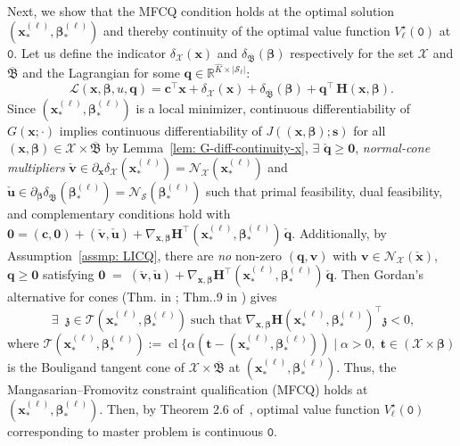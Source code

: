 \documentclass[opre,sglanonrev]{informs4}
\newcommand{\mL}{\mathcal{L}}          %
\newcommand{\mT}{\mathcal{T}}
\newcommand{\mS}{\mathcal{S}}
\newcommand{\mN}{\mathcal{N}}
\newcommand{\mX}{\mathcal{X}}
\newcommand{\mfB}{\mathfrak{B}}
\newcommand{\mbR}{\mathbb R}
\newcommand{\bbeta}{\bm{\beta}}
\newcommand{\bzero}{\bm{0}}
\newcommand{\bc}{\bm{c}}
\newcommand{\bq}{\bm{q}}
\newcommand{\bs}{\bm{s}}
\newcommand{\bt}{\bm{t}}
\newcommand{\bu}{\bm{u}}
\newcommand{\bv}{\bm{v}}
\newcommand{\bx}{\bm{x}}
\newcommand{\bH}{\bm{H}}
\begin{document}
{\begin{APPENDICES}
Next, we show that the MFCQ condition holds at the optimal solution \((\bx^{(\ell)}_*, \bbeta^{(\ell)}_*)\) and thereby continuity of the optimal value function $V^\star_\ell(\mathtt{0})$ at $\mathtt{0}$. Let us define the indicator 
$\delta_{\mX}(\bx)$ and $\delta_{\overline{\mfB}}(\bbeta)$ respectively for the set \(\mX\) and $\overline{\mfB}$ 
and the Lagrangian for some $\bq \in \mbR^{\hat{K} \times |\mS_\ell|}$:
\[
\mL(\bx, \bbeta, u, \bq)=
\bc^\top \bx +\delta_{\mX}(\bx) + \delta_{\overline{\mfB}}(\bbeta) + \bq^\top \, \bH(\bx, \bbeta).
\]
Since \((\bx^{(\ell)}_*, \bbeta^{(\ell)}_*)\) is a local minimizer, continuous differentiability of $G(\bx; \cdot )$ implies continuous differentiability of $J\left((\bx, \bbeta); \bs\right)$ for all $(\bx, \bbeta) \in \mX \times \overline{\mfB}$ by Lemma~\ref{lem: G-diff-continuity-x},
$\exists$ \(\check{\bq} \geq \bzero\), \emph{normal-cone multipliers} \(\check{\bv}\in \partial_{\bx} \delta_{\mX}(\bx^{(\ell)}_*) = \mN_{\mX}(\bx^{(\ell)}_*)\) and \(\check{\bu}\in \partial_{\bbeta} \delta_{\overline{\mfB}}(\bbeta^{(\ell)}_*) = \mN_{\mS}(\bbeta^{(\ell)}_*)\) 
such that primal feasibility, dual feasibility, and complementary conditions hold with $ \bzero=(\bc, \bzero) + (\check{\bv}, \check{\bu})
+\nabla_{\bx, \bbeta}\bH^\top(\bx^{(\ell)}_*, \bbeta^{(\ell)}_*) \, \check{\bq}.$ Additionally, by Assumption~\ref{assmp: LICQ}, there are \emph{no} non-zero \((\bq, \bv)\) with  
\(\bv\in\mN_{\mX}(\check{\bx})\), \(\bq \geq \bzero\) satisfying $ \bzero\;=\;(\check{\bv}, \check{\bu}) 
+\nabla_{\bx, \bbeta}\bH^\top(\bx^{(\ell)}_*, \bbeta^{(\ell)}_*) \, \check{\bq}.$ Then Gordan’s alternative for cones (Thm. in \cite{rockafellar2009variational};  
 Thm..9 in \cite{bazaraa2006nonlinear}) gives
\[
\;
\exists\; \; \mathfrak{z} \in\mT(\bx^{(\ell)}_*, \bbeta^{(\ell)}_*)\;\text{such that}\;
\nabla_{\bx, \bbeta}\bH(\bx^{(\ell)}_*, \bbeta^{(\ell)}_*)^{\!\top}\mathfrak{z}<0,
\]
where \(\mT(\bx^{(\ell)}_*, \bbeta^{(\ell)}_*):=\operatorname{cl}\bigl\{\alpha(\bt-(\bx^{(\ell)}_*, \bbeta^{(\ell)}_*))\mid
\alpha>0,\;\bt\in (\mX \times \bbeta)\) is the Bouligand tangent cone of \(\mX \times \overline{\mfB} \) at \((\bx^{(\ell)}_*, \bbeta^{(\ell)}_*)\).
Thus, the Mangasarian–Fromovitz constraint qualification (MFCQ) holds at \((\bx^{(\ell)}_*, \bbeta^{(\ell)}_*)\). Then, by Theorem 2.6 of~\cite{gauvin1977differential}, optimal value function $V^\star_\ell(\mathtt{0})$ corresponding to master problem is continuous $\mathtt{0}$. 


\end{APPENDICES}}
\end{document}
